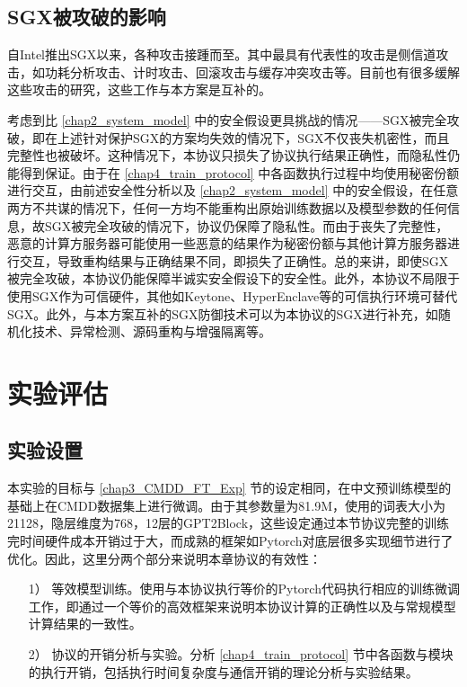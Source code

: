 \subsection{SGX被攻破的影响}

自Intel推出SGX以来，各种攻击接踵而至。其中最具有代表性的攻击是侧信道攻击，如功耗分析攻击、计时攻击、回滚攻击与缓存冲突攻击等\cite{SGX_Exposure, High_Resolution_Side_Channels, Cache_Attack_SGX, CacheZoom, SGX_Cache, mem_side_hazard, PMFaultFA, VoltJockeyAN}。目前也有很多缓解这些攻击的研究\cite{Oblix, Detecting_privileged_side_channel_attacks, Sanctum, Strong_and_Efficient_Cache_Side_Channel_Protection, T-SGX, minefield, MoLEMO, RepurposingSA}，这些工作与本方案是互补的。

考虑到比 \ref{chap2_system_model} 中的安全假设更具挑战的情况——SGX被完全攻破，即在上述针对保护SGX的方案均失效的情况下，SGX不仅丧失机密性，而且完整性也被破坏。这种情况下，本协议只损失了协议执行结果正确性，而隐私性仍能得到保证。由于在 \ref{chap4_train_protocol} 中各函数执行过程中均使用秘密份额进行交互，由前述安全性分析以及 \ref{chap2_system_model} 中的安全假设，在任意两方不共谋的情况下，任何一方均不能重构出原始训练数据以及模型参数的任何信息，故SGX被完全攻破的情况下，协议仍保障了隐私性。而由于丧失了完整性，恶意的计算方服务器可能使用一些恶意的结果作为秘密份额与其他计算方服务器进行交互，导致重构结果与正确结果不同，即损失了正确性。总的来讲，即使SGX被完全攻破，本协议仍能保障半诚实安全假设下的安全性。此外，本协议不局限于使用SGX作为可信硬件，其他如Keytone\cite{keystone}、HyperEnclave\cite{hyperenclave}等的可信执行环境可替代SGX。此外，与本方案互补的SGX防御技术可以为本协议的SGX进行补充，如随机化技术、异常检测、源码重构与增强隔离等。

\section{实验评估}

\subsection{实验设置} \label{chap4_exp_setting}


本实验的目标与 \ref{chap3_CMDD_FT_Exp} 节的设定相同，在中文预训练模型的基础上在CMDD数据集上进行微调。由于其参数量为81.9M，使用的词表大小为21128，隐层维度为768，12层的GPT2Block，这些设定通过本节协议完整的训练完时间硬件成本开销过于大，而成熟的框架如Pytorch对底层很多实现细节进行了优化。因此，这里分两个部分来说明本章协议的有效性：

\begin{itemize}
	\item[1）]等效模型训练。使用与本协议执行等价的Pytorch代码执行相应的训练微调工作，即通过一个等价的高效框架来说明本协议计算的正确性以及与常规模型计算结果的一致性。
	\item[2）]协议的开销分析与实验。分析 \ref{chap4_train_protocol} 节中各函数与模块的执行开销，包括执行时间复杂度与通信开销的理论分析与实验结果。
\end{itemize}


